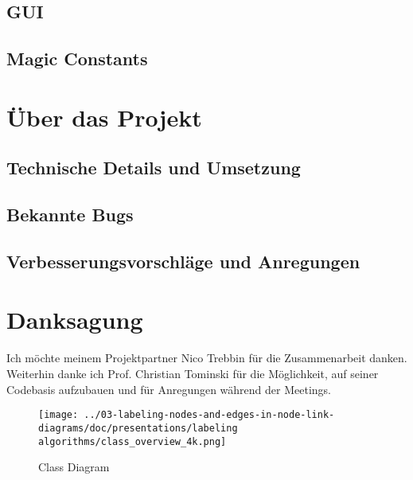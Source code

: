 \documentclass[final,nopreprintline]{elsarticle}
\begin{document}
\subsection{GUI}
\label{subsec:gui}
    

\subsection{Magic Constants}
\label{subsec:consts}
    


\section{Über das Projekt}
\label{sec:about}

\subsection{Technische Details und Umsetzung}
\label{subsec:technical}
    

\subsection{Bekannte Bugs}
\label{subsec:bugs}
    

\subsection{Verbesserungsvorschläge und Anregungen}
\label{subsec:suggest}
    

\section*{Danksagung}
Ich möchte meinem Projektpartner Nico Trebbin für die Zusammenarbeit danken.
Weiterhin danke ich Prof. Christian Tominski für die Möglichkeit, auf seiner Codebasis aufzubauen und für Anregungen während der Meetings.

 


\begin{landscape}
    \begin{figure}
        \centering
        \texttt{[image: ../03-labeling-nodes-and-edges-in-node-link-diagrams/doc/presentations/labeling algorithms/class\_overview\_4k.png]}
        \caption{Class Diagram}
        \label{fig:classdiag}
    \end{figure}
\end{landscape}

\end{document}
